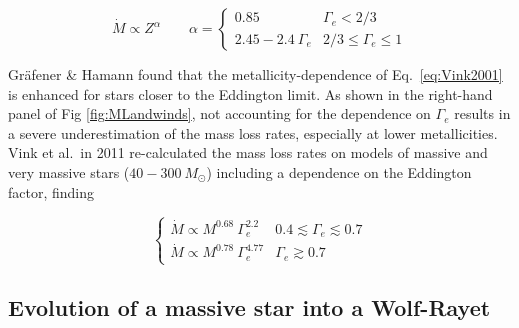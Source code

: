 \documentclass[a4paper,titlepage]{book}     	%
\newcommand{\sun}{\ensuremath{_\odot}}
\newcommand{\msun}{\ensuremath{M\sun}}
\begin{document}
\begin{equation}\label{eqn:WRwindGH2008}
\dot M \propto Z^{\alpha} \quad \quad  \alpha = 
\begin{cases}
0.85 & \Gamma_e < 2/3 \\
2.45-2.4~\Gamma_e & 2/3 \leq \Gamma_e \leq 1
\end{cases}
\end{equation}

Gr{\"a}fener \& Hamann found that the metallicity-dependence of Eq.\ \ref{eq:Vink2001} is enhanced for stars closer to the Eddington limit. As shown in the right-hand panel of Fig \ref{fig:MLandwinds}, not accounting for the dependence on $\Gamma_e$ results in a severe underestimation of the mass loss rates, especially at lower metallicities.\\

Vink et al.\ in 2011 \cite{Vink2011} re-calculated the mass loss rates on models of massive and very massive stars ($40-300~\msun$) including a dependence on the Eddington factor, finding

\begin{equation}\label{eqn:Vink2011}
\begin{cases}
\dot M \propto M^{0.68}\ \Gamma_e^{2.2} & 0.4 \lesssim \Gamma_e \lesssim 0.7 \\
\dot M \propto M^{0.78}\ \Gamma_e^{4.77} & \Gamma_e \gtrsim 0.7
\end{cases}
\end{equation}






\subsection{Evolution of a massive star into a Wolf-Rayet}\label{subsec:stellarevo}
\end{document}
